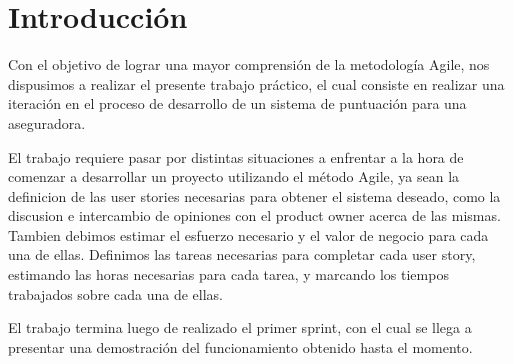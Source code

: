 \section{Introducción}

Con el objetivo de lograr una mayor comprensión de la metodología Agile, nos dispusimos a realizar el presente trabajo práctico, el cual consiste en realizar una iteración en el proceso de desarrollo de un sistema de puntuación para una aseguradora.

El trabajo requiere pasar por distintas situaciones a enfrentar a la hora de comenzar a desarrollar un proyecto utilizando el método Agile, ya sean la definicion de las user stories necesarias para obtener el sistema deseado, como la discusion e intercambio de opiniones con el product owner acerca de las mismas. Tambien debimos estimar el esfuerzo necesario y el valor de negocio para cada una de ellas. Definimos las tareas necesarias para completar cada user story, estimando las horas necesarias para cada tarea, y marcando los tiempos trabajados sobre cada una de ellas.

El trabajo termina luego de realizado el primer sprint, con el cual se llega a presentar una demostración del funcionamiento obtenido hasta el momento.